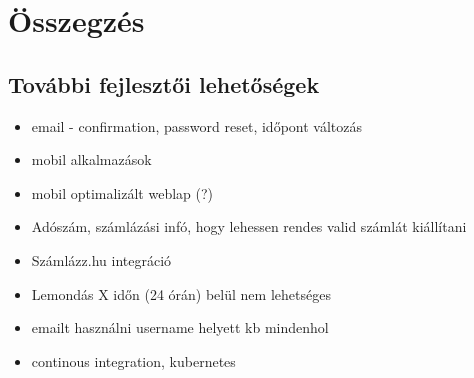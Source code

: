 \chapter{Összegzés} %
\label{ch:sum}



\section{További fejlesztői lehetőségek}
\begin{itemize}
    \item email - confirmation, password reset, időpont változás
    \item mobil alkalmazások
    \item mobil optimalizált weblap (?) 
    \item Adószám, számlázási infó, hogy lehessen rendes valid számlát kiállítani
    \item Számlázz.hu integráció
    \item Lemondás X időn (24 órán) belül nem lehetséges
    \item emailt használni username helyett kb mindenhol
    \item continous integration, kubernetes
\end{itemize}


